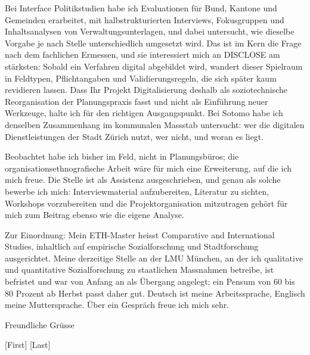 \documentclass[11pt,a4paper]{article}
\begin{document}
Bei Interface Politikstudien habe ich Evaluationen für Bund, Kantone und Gemeinden erarbeitet, mit halbstrukturierten Interviews, Fokusgruppen und Inhaltsanalysen von Verwaltungsunterlagen, und dabei untersucht, wie dieselbe Vorgabe je nach Stelle unterschiedlich umgesetzt wird. Das ist im Kern die Frage nach dem fachlichen Ermessen, und sie interessiert mich an DISCLOSE am stärksten: Sobald ein Verfahren digital abgebildet wird, wandert dieser Spielraum in Feldtypen, Pflichtangaben und Validierungsregeln, die sich später kaum revidieren lassen. Dass Ihr Projekt Digitalisierung deshalb als soziotechnische Reorganisation der Planungspraxis fasst und nicht als Einführung neuer Werkzeuge, halte ich für den richtigen Ausgangspunkt. Bei Sotomo habe ich denselben Zusammenhang im kommunalen Massstab untersucht: wer die digitalen Dienstleistungen der Stadt Zürich nutzt, wer nicht, und woran es liegt.

Beobachtet habe ich bisher im Feld, nicht in Planungsbüros; die organisationsethnografische Arbeit wäre für mich eine Erweiterung, auf die ich mich freue. Die Stelle ist als Assistenz ausgeschrieben, und genau als solche bewerbe ich mich: Interviewmaterial aufzubereiten, Literatur zu sichten, Workshops vorzubereiten und die Projektorganisation mitzutragen gehört für mich zum Beitrag ebenso wie die eigene Analyse.

Zur Einordnung: Mein ETH-Master heisst Comparative and International Studies, inhaltlich auf empirische Sozialforschung und Stadtforschung ausgerichtet. Meine derzeitige Stelle an der LMU München, an der ich qualitative und quantitative Sozialforschung zu staatlichen Massnahmen betreibe, ist befristet und war von Anfang an als Übergang angelegt; ein Pensum von 60 bis 80 Prozent ab Herbst passt daher gut. Deutsch ist meine Arbeitssprache, Englisch meine Muttersprache. Über ein Gespräch freue ich mich sehr.

\vspace{0.3em}

Freundliche Grüsse

\vspace{0.8em}

[First] [Last]
\end{document}
